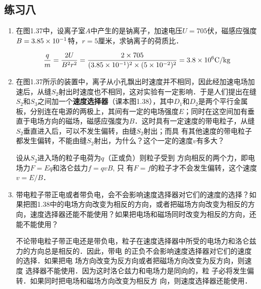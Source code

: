 \subsection{练习八}
\begin{enumerate}
    \item 在图1.37中，设离子室$A$中产生的是钠离子，加速电压$U=705$伏，磁感应强度$B=3. 85\times10^{-1}$特，$r=5$厘米，求钠离子的荷质比．


    \begin{solution}
\[\frac{q}{m}=\frac{2U}{B^2r^2}=\frac{2\times 705}{(3.85\times 10^{-1})^2\times (5\times 10^{-2})^2}=3.8\times 10^{6}{\rm C/kg}\]
    \end{solution}
    
    \item 在图1.37所示的装置中，离子从小孔飘出时速度并不相同，因此经加速电场加速后，从缝$S_2$射出时速度也不相同，这对实验有一定影响．于是人们提出在缝$S_2$和$S_3$之间加一个\textbf{速度选择器}（课本图1.38），其中$D_1$和$D_2$是两个平行金属板，分别连在电源的两极上，其间有一定的电场强度$E$；同时在这空间加有垂直于电场方向的磁场，磁感应强度为$B$．这时具有一定速度的带电粒子，从缝$S_2$垂直进入后，可以不发生偏转，由缝$S_2$射出；而具
有其他速度的带电粒子都发生偏转，不能由缝$S_2$射出，为什么？这个一定的速度$v$有多大？

\begin{solution}
    设从$S_2$进入场的粒子电荷为$q$（正或负）则粒子受到
    方向相反的两个力，即电场力$F=Eq$和洛仑兹力$f=qvB$, 只
    有$F=f$的粒子才不会发生偏转，这个速度$v=E/B$．
\end{solution}

\item 带电粒子带正电或者带负电，会不会影响速度选择器对它们的速度的选择？如果把图1.38中的电场方向改变为相反的方向，或者把磁场方向改变为相反的方向，速度选择器还能不能使用？如果把电场和磁场同时改变为相反的方向，还能不能使用？


\begin{solution}
    不论带电粒子带正电还是带负电，粒子在速度选择器中所受的电场力和洛仑兹力的方向总是相反的．因此，带电
    的正负不会影响速度选择器对它们的速度的选择．如果把电
    场方向改变为反方向或者把磁场方向改变为反方向，则速度
    选择器不能使用．因为这时洛仑兹力和电场力是同向的，粒
    子必将发生偏转．如果同时把电场和磁场方向改变为相反方
    向，则速度选择器还能使用．
\end{solution}

\end{enumerate}





